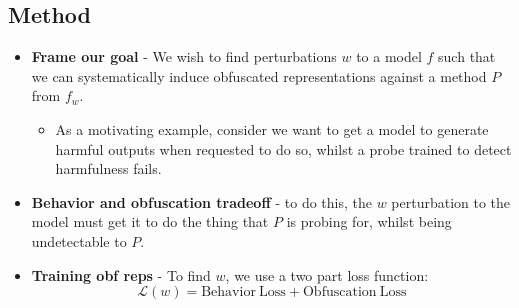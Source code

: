 \documentclass{article}
\begin{document}
\subsection{Method}
\begin{itemize}[noitemsep]
    \item \textbf{Frame our goal} - We wish to 
    find perturbations $w$ to a model $f$ such that 
    we can systematically induce obfuscated
    representations against a method $P$ from 
    $f_w$.
    \begin{itemize}[noitemsep]
        \item As a motivating example, consider 
        we want to get a model to generate harmful
        outputs when requested to do so, whilst 
        a probe trained to detect harmfulness 
        fails.
    \end{itemize} 
    \item \textbf{Behavior and obfuscation tradeoff} - 
    to do this, the $w$ perturbation to the model 
    must get it to do the thing that $P$ is probing 
    for, whilst being undetectable to $P$.
    \item \textbf{Training obf reps} - To find 
    $w$, we use a two part loss function:
    $$
    \mathcal{L}(w) = \mathrm{Behavior~Loss} + \mathrm{Obfuscation~Loss}  
    $$
\end{itemize}








\end{document}
